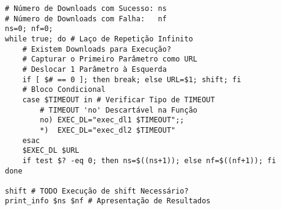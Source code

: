 \documentclass{article}
\begin{document}
\begin{verbatim}
# Número de Downloads com Sucesso: ns
# Número de Downloads com Falha:   nf
ns=0; nf=0;
while true; do # Laço de Repetição Infinito
    # Existem Downloads para Execução?
    # Capturar o Primeiro Parâmetro como URL
    # Deslocar 1 Parâmetro à Esquerda
    if [ $# == 0 ]; then break; else URL=$1; shift; fi
    # Bloco Condicional
    case $TIMEOUT in # Verificar Tipo de TIMEOUT
        # TIMEOUT 'no' Descartável na Função
        no) EXEC_DL="exec_dl1 $TIMEOUT";;
        *)  EXEC_DL="exec_dl2 $TIMEOUT"
    esac
    $EXEC_DL $URL
    if test $? -eq 0; then ns=$((ns+1)); else nf=$((nf+1)); fi
done

shift # TODO Execução de shift Necessário?
print_info $ns $nf # Apresentação de Resultados
\end{verbatim}
\end{document}
